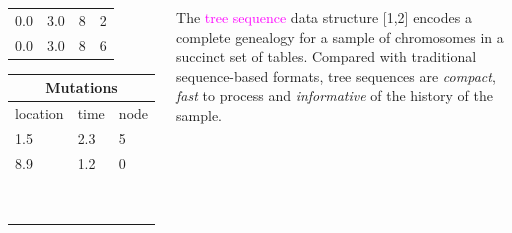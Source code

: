 \documentclass[25pt, a0paper, portrait, margin=0mm, innermargin=15mm,
     blockverticalspace=15mm, colspace=15mm, subcolspace=8mm]{tikzposter} %
\newcommand{\magenta}[1]{\textcolor{magenta}{#1}}
\begin{document}
\begin{columns}
{\begin{center}
{\begin{tabularx}{.10\textwidth}{p{1.5cm}p{1.5cm}p{2cm}X}
0.0 & 3.0 & 8 & 2\\
0.0 & 3.0 & 8 & 6 \\
\end{tabularx}\quad\quad\begin{tabularx}{.08\textwidth}{p{2.5cm}p{1.5cm}X}
\toprule
\multicolumn{3}{c}{{\bf Mutations}}\\
\midrule
location & time& node  \\
\midrule
1.5 & 2.3 & 5\\
8.9 & 1.2 & 0\\
 & &\\
 & &\\
 & &\\
 & &\\
 & &\\
 & &\\
 & &\\
 & & \\
 & & \\
 \end{tabularx}
}
\end{center}
\vspace{10mm}
The \magenta{tree sequence} data structure [1,2] encodes a complete genealogy for a sample of chromosomes in a succinct set of tables. Compared with traditional sequence-based formats, tree sequences are \emph{compact}, \emph{fast} to process and \emph{informative} of the history of the sample.
%
%
%
     }
     

\end{columns}
\end{document}
